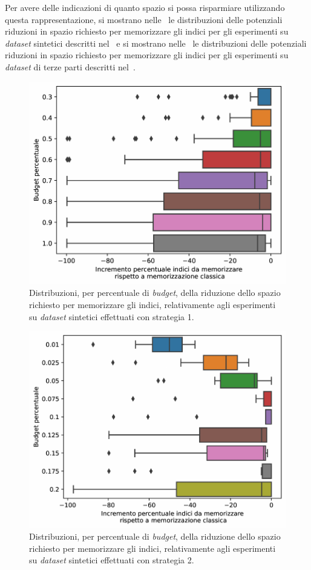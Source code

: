 Per avere delle indicazioni di quanto spazio si possa risparmiare utilizzando questa rappresentazione, si mostrano nelle~ le distribuzioni delle potenziali riduzioni in spazio richiesto per memorizzare gli indici per gli esperimenti su \emph{dataset} sintetici descritti nel~ e si mostrano nelle~ le distribuzioni delle potenziali riduzioni in spazio richiesto per memorizzare gli indici per gli esperimenti su \emph{dataset} di terze parti descritti nel~.
\begin{figure}
    \centering
    \includegraphics[width=.7\linewidth]{img/decremento_spazio_indici_exp2d_old.pdf}
    \caption{Distribuzioni, per percentuale di \emph{budget}, della riduzione dello spazio richiesto per memorizzare gli indici, relativamente agli esperimenti su \emph{dataset} sintetici effettuati con strategia 1.}
    \label{fig:dist_riduzione_synth_old}
\end{figure}%
\begin{figure}
    \centering
    \includegraphics[width=.7\linewidth]{img/decremento_spazio_indici_exp2d_new.pdf}
    \caption{Distribuzioni, per percentuale di \emph{budget}, della riduzione dello spazio richiesto per memorizzare gli indici, relativamente agli esperimenti su \emph{dataset} sintetici effettuati con strategia 2.}
    \label{fig:dist_riduzione_synth_new}
\end{figure}
